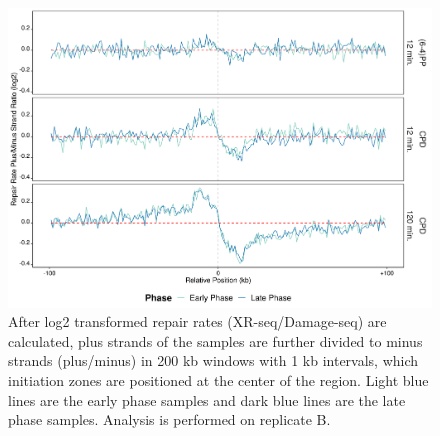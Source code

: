 \begin{figure}[H]
\begin{center}
\includegraphics[width=\textwidth]{Chapters/7_appendix/figures/supfig45}
\caption[Repair rate plus/minus ratio of initiation zones in 200 kb (replicate B).]{After log2 transformed repair rates (XR-seq/Damage-seq) are calculated, plus strands of the samples are further divided to minus strands (plus/minus) in 200 kb windows with 1 kb intervals, which initiation zones are positioned at the center of the region. Light blue lines are the early phase samples and dark blue lines are the late phase samples. Analysis is performed on replicate B.}
\label{supfig:rrpm200inzonesB}
\end{center}
\end{figure}

